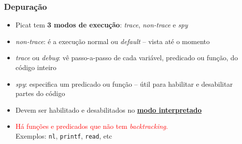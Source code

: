 \begin{frame}[fragile]

    \frametitle{Depuração}

    \begin{itemize}
    
      \item Picat tem \textbf{3 modos de execução}: \textit{trace},
      \textit{non-trace} e \textit{spy}
      \pause
      \item  \textit{non-trace}: é a execução normal ou \textit{default} -- vista até o momento

      \pause
      \item  \textit{trace} ou \textit{debug}: vê passo-a-passo de cada variável, predicado ou      função,  do código inteiro
      \pause
      \item \textit{spy}: especifica um predicado ou função -- útil para habilitar e desabilitar partes do código

      \pause
      \item Devem ser habilitado e desabilitados no \underline{\textbf{modo interpretado}}
    
      \item \textcolor{red}{Há funções e predicados que não tem \textit{backtracking}.}\\
      \pause
       Exemplos: \texttt{nl}, \texttt{printf}, \texttt{read}, etc
       
    \end{itemize}
\end{frame}


